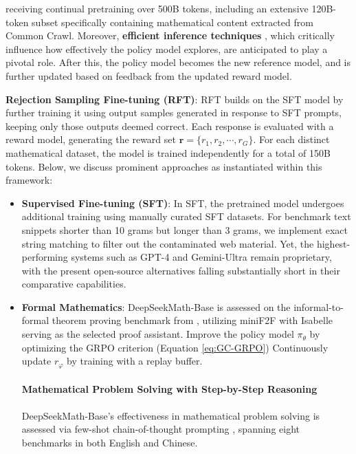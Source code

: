 receiving continual pretraining over 500B tokens, including an extensive 120B-token subset specifically containing mathematical content extracted from Common Crawl. Moreover, \textbf{efficient inference techniques} \citep{xia-etal-2023-speculative,leviathan2023fast,kwon2023efficient,xia2024unlocking}, which critically influence how effectively the policy model explores, are anticipated to play a pivotal role. After this, the policy model becomes the new reference model, and is further updated based on feedback from the updated reward model. \item \textbf{Rejection Sampling Fine-tuning (RFT)}: RFT builds on the SFT model by further training it using output samples generated in response to SFT prompts, keeping only those outputs deemed correct. Each response is evaluated with a reward model, generating the reward set $\mathbf{r}=\{r_1, r_2, \cdots, r_G\}$. For each distinct mathematical dataset, the model is trained independently for a total of 150B tokens. Below, we discuss prominent approaches as instantiated within this framework:

\begin{itemize}
    \item  \textbf{Supervised Fine-tuning (SFT)}: In SFT, the pretrained model undergoes additional training using manually curated SFT datasets. For benchmark text snippets shorter than 10 grams but longer than 3 grams, we implement exact string matching to filter out the contaminated web material. Yet, the highest-performing systems such as GPT-4 \citep{gpt4} and Gemini-Ultra \citep{gemini} remain proprietary, with the present open-source alternatives falling substantially short in their comparative capabilities. \item \textbf{Formal Mathematics}: DeepSeekMath-Base is assessed on the informal-to-formal theorem proving benchmark from \citep{dsp_proof}, utilizing miniF2F \citep{minif2f} with Isabelle \citep{isabelle} serving as the selected proof assistant. 
        \State Improve the policy model $\pi_{\theta}$ by optimizing the GRPO criterion (Equation \ref{eq:GC-GRPO})
      \EndFor
    \EndFor 
    \State Continuously update $r_\varphi$ by training with a replay buffer. \paragraph{Mathematical Problem Solving with Step-by-Step Reasoning}

DeepSeekMath-Base's effectiveness in mathematical problem solving is assessed via few-shot chain-of-thought prompting \citep{cot}, spanning eight benchmarks in both English and Chinese. \end{itemize}

